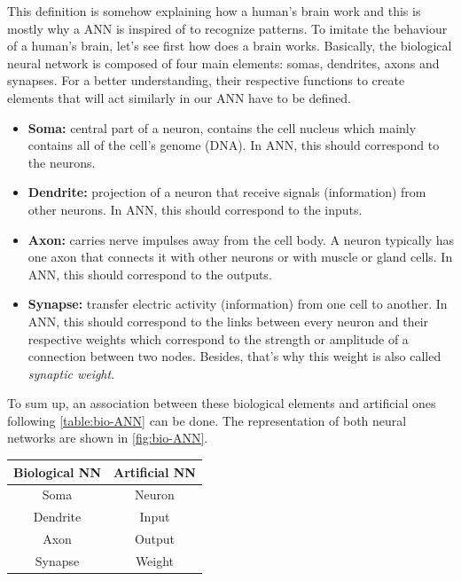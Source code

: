 \documentclass[11pt, openany]{report}
\theoremstyle{plain}
\theoremstyle{definition}
\theoremstyle{remark}
\begin{document}
This definition is somehow explaining how a human's brain work and this is mostly why a ANN is inspired of to recognize patterns. To imitate the behaviour of a human's brain, let's see first how does a brain works. Basically, the biological neural network is composed of four main elements:
somas, dendrites, axons and synapses. For a better understanding, their respective functions to create elements that will act similarly in our ANN have to be defined.
\begin{itemize}
\item \textbf{Soma:} central part of a neuron, contains the cell nucleus which mainly contains all of the cell's genome (DNA). In ANN, this should correspond to the neurons. 
\item \textbf{Dendrite:} projection of a neuron that receive signals (information) from other neurons. In ANN, this should correspond to the inputs. 
\item \textbf{Axon:} carries nerve impulses away from the cell body. A neuron typically has one axon that connects it with other neurons or with muscle or gland cells. In ANN, this should correspond to the outputs. 
\item \textbf{Synapse:} transfer electric activity (information) from one cell to another.  In ANN, this should correspond to the links between every neuron and their respective weights which correspond to the strength or amplitude of a connection between two nodes. Besides, that's why this weight is also called \textit{synaptic weight}. 
\end{itemize} 

To sum up, an association between these biological elements and artificial ones following \autoref{table:bio-ANN} can be done. The representation of both neural networks are shown in \autoref{fig:bio-ANN}. 

\begin{center}
    \begin{tabular}{|c|c|}
      \hline
      Biological NN & Artificial NN \\
      \hline
      Soma & Neuron \\
      \hline
      Dendrite & Input \\
      \hline
      Axon & Output \\
      \hline
      Synapse & Weight \\
      \hline
    \end{tabular}
    \label{table:bio-ANN}
\end{center}
\end{document}
